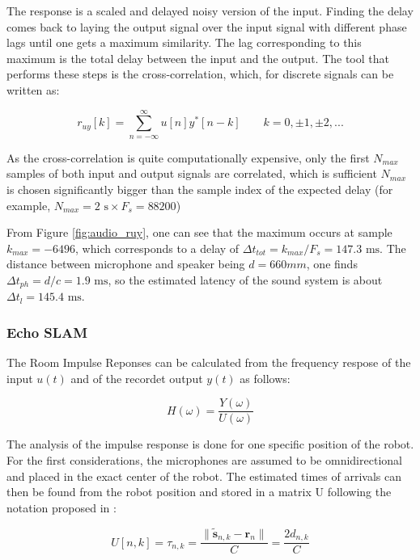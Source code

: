 The response is a scaled and delayed noisy version of the input. Finding the delay comes back to laying the output signal over the input signal with different phase lags until one gets a maximum similarity. The lag corresponding to this maximum is the total delay between the input and the output. The tool that performs these steps is the cross-correlation, which, for discrete signals can be written as: 

\begin{equation}
	r_{uy}[k] = \sum\limits_{n=-\infty}^{\infty} u[n]y^*[n-k] \hspace{2em} k=0,\pm1,\pm2,...
\end{equation}

As the cross-correlation is quite computationally expensive, only the first $N_{max}$ samples of both input and output signals are correlated, which is sufficient $N_{max}$ is chosen significantly bigger than the sample index of the expected delay (for example, $N_{max}=2  \text{ s} \times F_s = 88200$)

From Figure \ref{fig:audio_ruy}, one can see that the maximum occurs at sample $k_{max}=-6496$, which corresponds to a delay of $\Delta t_{tot}=k_{max}/F_s=147.3 \text{ ms}$. The distance between microphone and speaker being $d=660mm$, one finds $\Delta t_{ph} = d/c=1.9  \text{ ms}$, so the estimated latency of the sound system is about $\Delta t_{l}=145.4 \text{ ms}$.

\subsubsection{Echo SLAM}

The Room Impulse Reponses can be calculated from the frequency respose of the input $u(t)$ and of the recordet output $y(t)$ as follows:

\begin{equation}
    H(\omega) = \frac{Y(\omega)}{U(\omega)}
    \label{eq:impulse}
\end{equation}

The analysis of the impulse response is done for one specific position of the robot. For the first considerations, the microphones are assumed to be omnidirectional and placed in the exact center of the robot. 
The estimated times of arrivals can then be found from the robot position and stored in a matrix U following the notation proposed in \cite{Miranda}:

\begin{equation}
    U[n,k]=\tau_{n,k}=\frac{\| \tilde{\mathbf{s}}_{n,k}-\mathbf{r}_{n} \|}{C}=\frac{2d_{n,k}}{C}
    \label{eq:TOA}
\end{equation}

